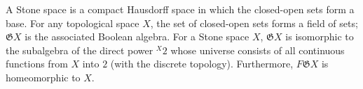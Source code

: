 A Stone space is a compact Hausdorff space in which the closed-open sets form a base. For any topological space $X$, the set of closed-open sets forms a field of sets; $\mathfrak{G}X$ is the associated Boolean algebra. For a Stone space $X$, $\mathfrak{G}X$ is isomorphic to the subalgebra of the direct power $^{X}2$ whose universe consists of all continuous functions from $X$ into $2$ (with the discrete topology). Furthermore, $F\mathfrak{G}X$ is homeomorphic to $X$.
